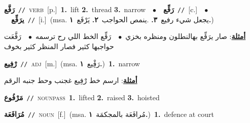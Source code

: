 \documentclass[10pt,a4paper,twoside]{article} %
\begin{document}
\begin{multicols}{2}
{\setlength\topsep{0pt}\textbf{\foreignlanguage{arabic}{رَفَّع}}\ {\color{gray}\texttt{//}\color{black}}\ \textsc{verb}\ [p.]\ \textbf{1.}~lift  \textbf{2.}~thread  \textbf{3.}~narrow\ \ $\bullet$\ \ \setlength\topsep{0pt}\textbf{\foreignlanguage{arabic}{رَفِّع}}\ {\color{gray}\texttt{//}\color{black}}\ [c.]\ \ $\bullet$\ \ \setlength\topsep{0pt}\textbf{\foreignlanguage{arabic}{يرَفِّع}}\ {\color{gray}\texttt{//}\color{black}}\ [i.]\ \color{gray}(msa. \foreignlanguage{arabic}{يجعل شيء رفيع}~\foreignlanguage{arabic}{\textbf{٣.}}  .\foreignlanguage{arabic}{ينمص الحواجب}~\foreignlanguage{arabic}{\textbf{٢.}}  \foreignlanguage{arabic}{يَرْفَع}~\foreignlanguage{arabic}{\textbf{١.}})\color{black}\  \begin{flushright}\color{gray}\foreignlanguage{arabic}{\textbf{\underline{\foreignlanguage{arabic}{أمثلة}}}: صار يرَفِّع بهالنطلون ومنظره بخزي\ $\bullet$\ \  رَفِّع الخط اللي رح ترسمه\ $\bullet$\ \  رَفَّعَت حواجبها كثير فصار المنظر كثير بخوف}\end{flushright}\color{black}} \vspace{2mm}

{\setlength\topsep{0pt}\textbf{\foreignlanguage{arabic}{رْفِيع}}\ {\color{gray}\texttt{//}\color{black}}\ \textsc{adj}\ [m.]\ \color{gray}(msa. \foreignlanguage{arabic}{رَفِْيع}~\foreignlanguage{arabic}{\textbf{١.}})\color{black}\ \textbf{1.}~narrow\  \begin{flushright}\color{gray}\foreignlanguage{arabic}{\textbf{\underline{\foreignlanguage{arabic}{أمثلة}}}: ارسم خط رْفِيع غجنب وحط جنبه الرقم}\end{flushright}\color{black}} \vspace{2mm}

{\setlength\topsep{0pt}\textbf{\foreignlanguage{arabic}{مَرْفُوع}}\ {\color{gray}\texttt{//}\color{black}}\ \textsc{noun\textunderscore pass}\ \textbf{1.}~lifted  \textbf{2.}~raised  \textbf{3.}~hoisted\ } \vspace{2mm}

{\setlength\topsep{0pt}\textbf{\foreignlanguage{arabic}{مُرَافَعَة}}\ {\color{gray}\texttt{//}\color{black}}\ \textsc{noun}\ [f.]\ \color{gray}(msa. \foreignlanguage{arabic}{مُرافَعَة بالمجكمَة}~\foreignlanguage{arabic}{\textbf{١.}})\color{black}\ \textbf{1.}~defence at court\ } \vspace{2mm}


\end{multicols}
\end{document}
